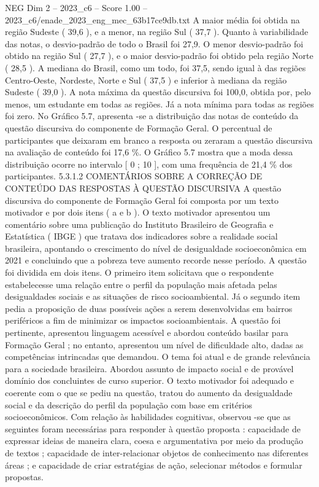 \begin{textsample}{NEG Dim 2 – 2023\_c6 – Score 1.00 – 2023\_c6/enade\_2023\_eng\_mec\_63b17ce9db.txt}
A maior média foi obtida na região Sudeste ( 39,6 ), e a menor, na região Sul ( 37,7 ).
Quanto à variabilidade das notas, o desvio-padrão de todo o Brasil foi 27,9.
O menor desvio-padrão foi obtido na região Sul ( 27,7 ), e o maior desvio-padrão foi obtido pela região Norte ( 28,5 ).
A mediana do Brasil, como um todo, foi 37,5, sendo igual à das regiões Centro-Oeste, Nordeste, Norte e Sul ( 37,5 ) e inferior à mediana da região Sudeste ( 39,0 ).
A nota máxima da questão discursiva foi 100,0, obtida por, pelo menos, um estudante em todas as regiões.
Já a nota mínima para todas as regiões foi zero.
No Gráfico 5.7, apresenta -se a distribuição das notas de conteúdo da questão discursiva do componente de Formação Geral.
O percentual de participantes que deixaram em branco a resposta ou zeraram a questão discursiva na avaliação de conteúdo foi 17,6 \%.
O Gráfico 5.7 mostra que a moda dessa distribuição ocorre no intervalo [ 0 ; 10 ], com uma frequência de 21,4 \% dos participantes. 5.3.1.2 COMENTÁRIOS SOBRE A CORREÇÃO DE CONTEÚDO DAS RESPOSTAS À QUESTÃO DISCURSIVA A questão discursiva do componente de Formação Geral foi composta por um texto motivador e por dois itens ( a e b ).
O texto motivador apresentou um comentário sobre uma publicação do Instituto Brasileiro de Geografia e Estatística ( IBGE ) que tratava dos indicadores sobre a realidade social brasileira, apontando o crescimento do nível de desigualdade socioeconômica em 2021 e concluindo que a pobreza teve aumento recorde nesse período.
A questão foi dividida em dois itens.
O primeiro item solicitava que o respondente estabelecesse uma relação entre o perfil da população mais afetada pelas desigualdades sociais e as situações de risco socioambiental.
Já o segundo item pedia a proposição de duas possíveis ações a serem desenvolvidas em bairros periféricos a fim de minimizar os impactos socioambientais.
A questão foi pertinente, apresentou linguagem acessível e abordou conteúdo basilar para Formação Geral ; no entanto, apresentou um nível de dificuldade alto, dadas as competências intrincadas que demandou.
O tema foi atual e de grande relevância para a sociedade brasileira.
Abordou assunto de impacto social e de provável domínio dos concluintes de curso superior.
O texto motivador foi adequado e coerente com o que se pediu na questão, tratou do aumento da desigualdade social e da descrição do perfil da população com base em critérios socioeconômicos.
Com relação às habilidades cognitivas, observou -se que as seguintes foram necessárias para responder à questão proposta : capacidade de expressar ideias de maneira clara, coesa e argumentativa por meio da produção de textos ; capacidade de inter-relacionar objetos de conhecimento nas diferentes áreas ; e capacidade de criar estratégias de ação, selecionar métodos e formular propostas.

\end{textsample}
